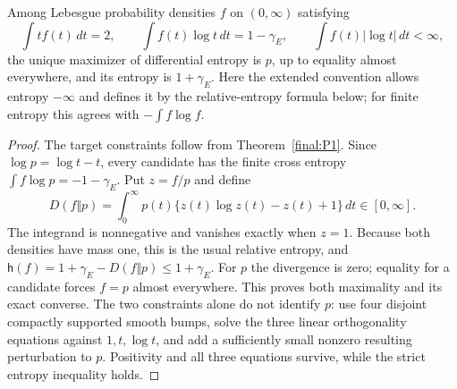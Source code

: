 \begin{theorem}
\label{final:P7}
Among Lebesgue probability densities $f$ on $(0,\infty)$ satisfying
\[
 \int t f(t)\,dt=2,\qquad
 \int f(t)\log t\,dt=1-\gamma_E,
 \qquad \int f(t)|\log t|\,dt<\infty,
\]
the unique maximizer of differential entropy is $p$, up to equality
almost everywhere, and its entropy is $1+\gamma_E$.
Here the extended convention allows entropy $-\infty$ and defines
it by the relative-entropy formula below; for finite entropy this
agrees with $-\int f\log f$.
\end{theorem}
\begin{proof}
The target constraints follow from Theorem~\ref{final:P1}.
Since $\log p=\log t-t$, every candidate has the finite cross entropy
$\int f\log p=-1-\gamma_E$.  Put $z=f/p$ and define
\[
 D(f\Vert p)=\int_0^\infty p(t)
          \{z(t)\log z(t)-z(t)+1\}\,dt\in[0,\infty].
\]
The integrand is nonnegative and vanishes exactly when $z=1$.
Because both densities have mass one, this is the usual relative
entropy, and
$\mathsf h(f)=1+\gamma_E-D(f\Vert p)\leq1+\gamma_E$.
For $p$ the divergence is zero; equality for a candidate forces
$f=p$ almost everywhere.  This proves both maximality and its exact
converse.  The two constraints alone do not identify $p$: use four
disjoint compactly supported smooth bumps, solve the three linear
orthogonality equations against $1,t,\log t$, and add a sufficiently
small nonzero resulting perturbation to $p$.  Positivity and all
three equations survive, while the strict entropy inequality holds.
\end{proof}

